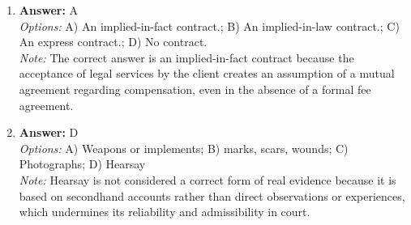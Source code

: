 \documentclass[12pt]{article}
\begin{document}
\begin{enumerate}[label=\arabic*.]
\item \textbf{Answer:} A
\\ \textit{Options:} A) An implied-in-fact contract.; B) An implied-in-law contract.; C) An express contract.; D) No contract.
\\ \textit{Note:} The correct answer is an implied-in-fact contract because the acceptance of legal services by the client creates an assumption of a mutual agreement regarding compensation, even in the absence of a formal fee agreement.
\item \textbf{Answer:} D
\\ \textit{Options:} A) Weapons or implements; B) marks, scars, wounds; C) Photographs; D) Hearsay
\\ \textit{Note:} Hearsay is not considered a correct form of real evidence because it is based on secondhand accounts rather than direct observations or experiences, which undermines its reliability and admissibility in court.
\end{enumerate}
\end{document}
